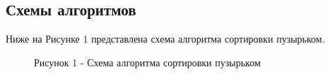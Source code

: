 \documentclass[14pt, a4paper]{extarticle}
\begin{document}
	\subsection{Схемы алгоритмов}
	Ниже на Рисунке 1 представлена схема алгоритма сортировки пузырьком.
	\begin{figure}[h!]
		\caption*{Рисунок 1 - Схема алгоритма сортировки пузырьком}
	\end{figure}
	
\end{document}
